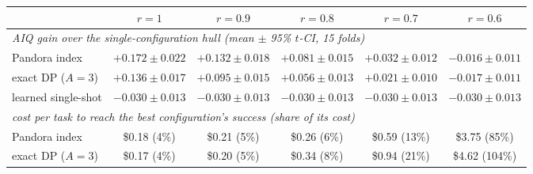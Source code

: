 \begin{tabular}{lccccc}\toprule
 & $r=1$ & $r=0.9$ & $r=0.8$ & $r=0.7$ & $r=0.6$\\\midrule
\multicolumn{6}{l}{\emph{AIQ gain over the single-configuration hull (mean $\pm$ 95\% $t$-CI, 15 folds)}}\\
Pandora index & $+0.172\pm0.022$ & $+0.132\pm0.018$ & $+0.081\pm0.015$ & $+0.032\pm0.012$ & $-0.016\pm0.011$ \\
exact DP ($A{=}3$) & $+0.136\pm0.017$ & $+0.095\pm0.015$ & $+0.056\pm0.013$ & $+0.021\pm0.010$ & $-0.017\pm0.011$ \\
learned single-shot & $-0.030\pm0.013$ & $-0.030\pm0.013$ & $-0.030\pm0.013$ & $-0.030\pm0.013$ & $-0.030\pm0.013$ \\
\midrule
\multicolumn{6}{l}{\emph{cost per task to reach the best configuration's success (share of its cost)}}\\
Pandora index & \$0.18 (4\%) & \$0.21 (5\%) & \$0.26 (6\%) & \$0.59 (13\%) & \$3.75 (85\%) \\
exact DP ($A{=}3$) & \$0.17 (4\%) & \$0.20 (5\%) & \$0.34 (8\%) & \$0.94 (21\%) & \$4.62 (104\%) \\
\bottomrule\end{tabular}
